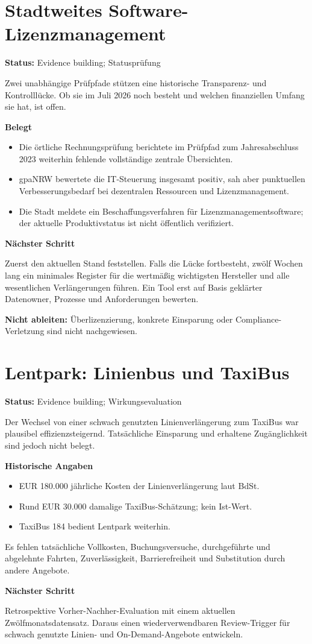 \documentclass[11pt,a4paper]{article}
\newcommand{\fall}[3]{%
  \clearpage
  \section{#1}
  \textbf{Status:} #2

  #3
}
\begin{document}
\fall{Stadtweites Software-Lizenzmanagement}{Evidence building; Statusprüfung}{
Zwei unabhängige Prüfpfade stützen eine historische Transparenz- und Kontrolllücke. Ob sie im Juli 2026 noch besteht und welchen finanziellen Umfang sie hat, ist offen.

\textbf{Belegt}
\begin{itemize}
  \item Die örtliche Rechnungsprüfung berichtete im Prüfpfad zum Jahresabschluss 2023 weiterhin fehlende vollständige zentrale Übersichten.
  \item gpaNRW bewertete die IT-Steuerung insgesamt positiv, sah aber punktuellen Verbesserungsbedarf bei dezentralen Ressourcen und Lizenzmanagement.
  \item Die Stadt meldete ein Beschaffungsverfahren für Lizenzmanagementsoftware; der aktuelle Produktivstatus ist nicht öffentlich verifiziert.
\end{itemize}

\textbf{Nächster Schritt}

Zuerst den aktuellen Stand feststellen. Falls die Lücke fortbesteht, zwölf Wochen lang ein minimales Register für die wertmäßig wichtigsten Hersteller und alle wesentlichen Verlängerungen führen. Ein Tool erst auf Basis geklärter Datenowner, Prozesse und Anforderungen bewerten.

\textbf{Nicht ableiten:} Überlizenzierung, konkrete Einsparung oder Compliance-Verletzung sind nicht nachgewiesen.
}

\fall{Lentpark: Linienbus und TaxiBus}{Evidence building; Wirkungsevaluation}{
Der Wechsel von einer schwach genutzten Linienverlängerung zum TaxiBus war plausibel effizienzsteigernd. Tatsächliche Einsparung und erhaltene Zugänglichkeit sind jedoch nicht belegt.

\textbf{Historische Angaben}
\begin{itemize}
  \item EUR 180.000 jährliche Kosten der Linienverlängerung laut BdSt.
  \item Rund EUR 30.000 damalige TaxiBus-Schätzung; kein Ist-Wert.
  \item TaxiBus 184 bedient Lentpark weiterhin.
\end{itemize}

Es fehlen tatsächliche Vollkosten, Buchungsversuche, durchgeführte und abgelehnte Fahrten, Zuverlässigkeit, Barrierefreiheit und Substitution durch andere Angebote.

\textbf{Nächster Schritt}

Retrospektive Vorher-Nachher-Evaluation mit einem aktuellen Zwölfmonatsdatensatz. Daraus einen wiederverwendbaren Review-Trigger für schwach genutzte Linien- und On-Demand-Angebote entwickeln.
}
\end{document}
